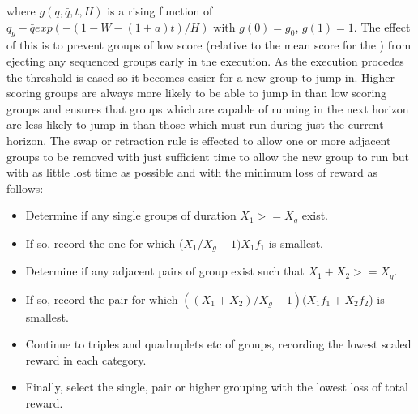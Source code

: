 \begin{itemize}
where $g(q,\bar{q},t,H)$ is a rising function of $q_g-\bar{q}exp(-(1-W-(1+a)t)/H)$ with $g(0) = g_0$, $g(1) = 1$. The effect of this is to prevent groups of low score (relative to the mean score for the \echelon) from ejecting any sequenced groups early in the execution. As the execution procedes the threshold is eased so it becomes easier for a new group to jump in. Higher scoring groups are always more likely to be able to jump in than low scoring groups and ensures that groups which are capable of running in the next horizon are less likely to jump in than those which must run during just the current horizon. The swap or retraction rule is effected to allow one or more adjacent groups to be removed with just sufficient time to allow the new group to run but with as little lost time as possible and with the minimum loss of reward as follows:-

\renewcommand{\labelitemii}{$\triangleright$}

\begin{itemize}  
  \item Determine if any single groups of duration $X_1 >= X_g$ exist. 
  \item If so, record the one for which ($X_1/X_g-1)X_1f_1$ is smallest.
  \item Determine if any adjacent pairs of group exist such that $X_1+X_2 >= X_g$.
  \item If so, record the pair for which $((X_1+X_2)/X_g-1)(X_1f_1+X_2f_2$) is smallest.
  \item Continue to triples and quadruplets etc of groups, recording the lowest scaled reward in each category.
  \item Finally, select the single, pair or higher grouping with the lowest loss of total reward.
\end{itemize}

\end{itemize}
